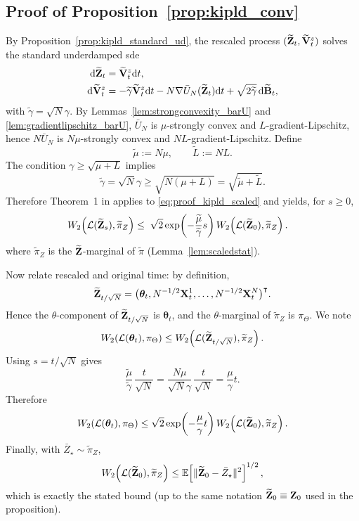 \subsection{Proof of Proposition~\ref{prop:kipld_conv}}\label{app:proofkipld_conv}
By Proposition~\ref{prop:kipld_standard_ud}, the rescaled process
\((\widetilde{{\mathbf Z}}_t,\widetilde{{\mathbf V}}_t^z)\) solves the standard underdamped \gls*{sde}
\begin{equation}\label{eq:proof_kipld_scaled}
\begin{aligned}
{\mathrm d} \widetilde{{\mathbf Z}}_t &= \widetilde{{\mathbf V}}_t^{z}{\mathrm d} t,\\
{\mathrm d} \widetilde{{\mathbf V}}_t^z
&= -\widetilde{\gamma}\widetilde{{\mathbf V}}_t^z{\mathrm d} t
- N \nabla \bar{U}_N(\widetilde{{\mathbf Z}}_t){\mathrm d} t
+ \sqrt{2\widetilde{\gamma}}\,{\mathrm d} \widetilde{{\mathbf B}}_t,
\end{aligned}
\end{equation}
with $\widetilde{\gamma}=\sqrt{N}\gamma$. By Lemmas~\ref{lem:strongconvexity_barU} and \ref{lem:gradientlipschitz_barU},
\(\bar U_N\) is \(\mu\)-strongly convex and \(L\)-gradient-Lipschitz, hence
\(N\bar{U}_N\) is \(N\mu\)-strongly convex and \(NL\)-gradient-Lipschitz. Define
\[
\widetilde{\mu}:=N\mu,\qquad \widetilde{L}:=NL.
\]
The condition \(\gamma\ge \sqrt{\mu+L}\) implies
\[
\widetilde{\gamma}=\sqrt{N}\gamma \ge \sqrt{N(\mu+L)}=\sqrt{\widetilde{\mu}+\widetilde{L}}.
\]
Therefore Theorem~1 in \citep{dalalyan2018sampling} applies to
\eqref{eq:proof_kipld_scaled} and yields, for \(s\ge 0\),
\begin{align*}
W_2\!\left(\mathcal{L}(\widetilde{{\mathbf Z}}_s),\widetilde\pi_Z\right)
&\le\;
\sqrt{2}\exp\!\left(-\frac{\widetilde{\mu}}{\widetilde{\gamma}}s\right)
W_2\!\left(\mathcal{L}(\widetilde{{\mathbf Z}}_0),\widetilde\pi_Z\right).
\end{align*}
where \(\widetilde\pi_Z\) is the \(\widetilde{{\mathbf Z}}\)-marginal of \(\widetilde{\pi}\)
(Lemma~\ref{lem:scaledstat}).

Now relate rescaled and original time: by definition,
\[
\widetilde{{\mathbf Z}}_{t/\sqrt{N}}
=\big(\bm{\theta}_{t},N^{-1/2}{\mathbf X}_t^1,\ldots,N^{-1/2}{\mathbf X}_t^N\big)^\intercal.
\]
Hence the \(\theta\)-component of \(\widetilde{{\mathbf Z}}_{t/\sqrt{N}}\) is \(\bm{\theta}_t\), and
the \(\theta\)-marginal of \(\widetilde\pi_Z\) is \(\pi_\Theta\). We note
\begin{equation*}
W_2\!\left(\mathcal{L}(\bm{\theta}_t),\pi_\Theta\right)
\le
W_2\!\left(\mathcal{L}(\widetilde{{\mathbf Z}}_{t/\sqrt{N}}),\widetilde\pi_Z\right).
\end{equation*}
Using \(s=t/\sqrt{N}\) gives
\[
\frac{\widetilde{\mu}}{\widetilde{\gamma}}\,\frac{t}{\sqrt{N}}
=\frac{N\mu}{\sqrt{N}\gamma}\,\frac{t}{\sqrt{N}}
=\frac{\mu}{\gamma}t.
\]
Therefore
\begin{equation*}
W_2\!\left(\mathcal{L}(\bm{\theta}_t),\pi_\Theta\right)
\le
\sqrt{2}\exp\!\left(-\frac{\mu}{\gamma}t\right)
W_2\!\left(\mathcal{L}(\widetilde{{\mathbf Z}}_0),\widetilde\pi_Z\right).
\end{equation*}
Finally, with \(\bar Z_\star\sim \widetilde\pi_Z\),
\[
W_2\!\left(\mathcal{L}(\widetilde{{\mathbf Z}}_0),\widetilde\pi_Z\right)
\le \mathbb{E}\!\left[\|\widetilde{{\mathbf Z}}_0-\bar Z_\star\|^2\right]^{1/2},
\]
which is exactly the stated bound (up to the same notation
\(\widetilde{{\mathbf Z}}_0\equiv {\mathbf Z}_0\) used in the proposition).

